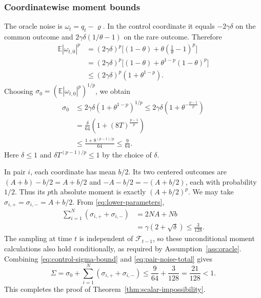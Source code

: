 \documentclass[11pt,letterpaper]{article}
\theoremstyle{definition}
\newcommand{\E}{\mathbb E}
\newcommand{\F}{\mathcal F}
\begin{document}
\subsubsection{Coordinatewise moment bounds}

The oracle noise is $\omega_t=q_t-\varrho$. In the control coordinate it
equals $-2\gamma\delta$ on the common outcome and
$2\gamma\delta(1/\theta-1)$ on the rare outcome. Therefore
\begin{align}
\E|\omega_{t,0}|^p
&=(2\gamma\delta)^p\bigl[(1-\theta)+\theta(\frac{1}{\theta}-1)^p\bigr]\nonumber\\
&=(2\gamma\delta)^p\bigl[(1-\theta)+\theta^{1-p}(1-\theta)^p\bigr]\nonumber\\
&\le(2\gamma\delta)^p(1+\theta^{1-p}).
\label{eq:control-p-moment}
\end{align}
Choosing $\sigma_0=(\E|\omega_{t,0}|^p)^{1/p}$, we obtain
\begin{align}
\sigma_0
&\le2\gamma\delta(1+\theta^{1-p})^{1/p}
\le2\gamma\delta(1+\theta^{-\frac{p-1}{p}})\nonumber\\
&=\frac{\delta}{64}\left(1+(8T)^{\frac{p-1}{p}}\right)
\label{eq:control-sigma}\\
&\le\frac{1+8^{(p-1)/p}}{64}
\le\frac9{64}.
\label{eq:control-sigma-bound}
\end{align}
Here $\delta\le1$ and $\delta T^{(p-1)/p}\le1$ by the choice of $\delta$.

In pair $i$, each coordinate has mean $b/2$. Its two centered outcomes are
$(A+b)-b/2=A+b/2$ and $-A-b/2=-(A+b/2)$, each with probability $1/2$.
Thus its $p$th absolute moment is exactly $(A+b/2)^p$. We may take
$\sigma_{i,+}=\sigma_{i,-}=A+b/2$. From \eqref{eq:lower-parameters},
\begin{align}
\sum_{i=1}^N(\sigma_{i,+}+\sigma_{i,-})
&=2NA+Nb\\
&=\gamma(2+\sqrt\delta)
\le\frac3{128}.
\label{eq:pair-noise-total}
\end{align}
The sampling at time $t$ is independent
of $\F_{t-1}$, so these unconditional moment calculations also hold
conditionally, as required by Assumption~\ref{ass:oracle}.
Combining \eqref{eq:control-sigma-bound} and
\eqref{eq:pair-noise-total} gives
\begin{equation}
\Sigma
=\sigma_0+\sum_{i=1}^N(\sigma_{i,+}+\sigma_{i,-})
\le\frac9{64}+\frac3{128}=\frac{21}{128}<1.
\label{eq:lower-noise-budget}
\end{equation}
This completes the proof of Theorem~\ref{thm:scalar-impossibility}.
\end{document}
